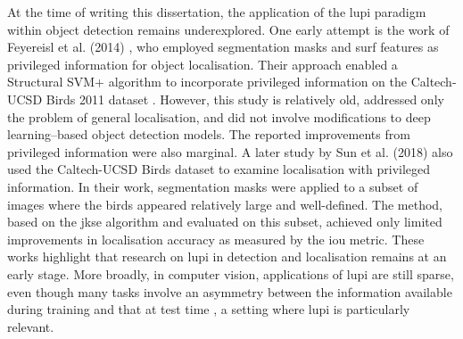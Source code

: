 
At the time of writing this dissertation, the application of the \gls{lupi} paradigm within object detection remains underexplored. One early attempt is the work of Feyereisl et al. (2014) \cite{lupi_od_extra1}, who employed segmentation masks and \gls{surf} features as privileged information for object localisation. Their approach enabled a Structural SVM+ algorithm to incorporate privileged information on the Caltech-UCSD Birds 2011 dataset \cite{birds_dataset}. However, this study is relatively old, addressed only the problem of general localisation, and did not involve modifications to deep learning–based object detection models. The reported improvements from privileged information were also marginal. A later study by Sun et al. (2018) \cite{lupi_od_extra2} also used the Caltech-UCSD Birds dataset to examine localisation with privileged information. In their work, segmentation masks were applied to a subset of images where the birds appeared relatively large and well-defined. The method, based on the \gls{jkse} algorithm \cite{jkse} and evaluated on this subset, achieved only limited improvements in localisation accuracy as measured by the \gls{iou} metric. These works highlight that research on \gls{lupi} in detection and localisation remains at an early stage. More broadly, in computer vision, applications of \gls{lupi} are still sparse, even though many tasks involve an asymmetry between the information available during training and that at test time \cite{learning2rank}, a setting where \gls{lupi} is particularly relevant.

